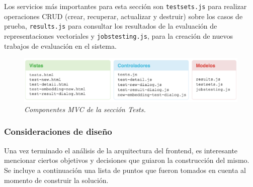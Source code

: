 Los servicios más importantes para esta sección son \texttt{testsets.js} para realizar operaciones
CRUD (crear, recuperar, actualizar y destruir) sobre los casos de prueba, \texttt{results.js} para
consultar los resultados de la evaluación de representaciones vectoriales y \texttt{jobstesting.js}, para
la creación de nuevos trabajos de evaluación en el sistema.

\begin{figure}[h]
    \centering
    \includegraphics[width=\textwidth]{images/ui-nabu-mvc-tests}
    \caption{\textit{Componentes MVC de la sección Tests.}}
    \label{fig:ui-nabu-mvc-tests}
\end{figure}

\subsubsection{Consideraciones de diseño}

Una vez terminado el análisis de la arquitectura del frontend, es interesante mencionar ciertos objetivos y
decisiones que guiaron la construcción del mismo. Se incluye a continuación una lista de puntos que fueron
tomados en cuenta al momento de construir la solución.

